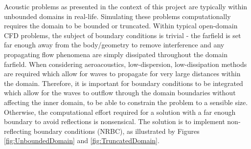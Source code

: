 Acoustic problems as presented in the context of this project are typically within unbounded domains in real-life. Simulating these problems computationally requires the domain to be bounded or truncated. Within typical open-domain CFD problems, the subject of boundary conditions is trivial - the farfield is set far enough away from the body/geometry to remove interference and any propagating flow phenomena are simply dissipated throughout the domain farfield. When considering aeroacoustics, low-dispersion, low-dissipation methods are required which allow for waves to propagate for very large distances within the domain. Therefore, it is important for boundary conditions to be integrated which allow for the waves to outflow through the domain boundaries without affecting the inner domain, to be able to constrain the problem to a sensible size. Otherwise, the computational effort required for a solution with a far enough boundary to avoid reflections is nonsensical. The solution is to implement non-reflecting boundary conditions (NRBC), as illustrated by Figures \ref{fig:UnboundedDomain} and \ref{fig:TruncatedDomain}.


